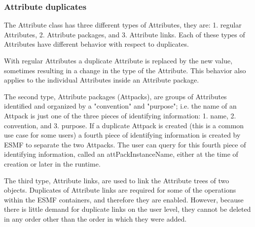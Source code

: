 \subsubsection{Attribute duplicates}

The Attribute class has three different types of Attributes, they are: 1. regular Attributes, 2. Attribute packages, and 3. Attribute links.  Each of these types of Attributes have different behavior with respect to duplicates.

With regular Attributes a duplicate Attribute is replaced by the new value, sometimes resulting in a change in the type of the Attribute.  This behavior also applies to the individual Attributes inside an Attribute package.

The second type, Attribute packages (Attpacks), are groups of Attributes identified and organized by a "convention" and "purpose";  i.e. the name of an Attpack is just one of the three pieces of identifying information: 1. name, 2. convention, and 3. purpose.  If a duplicate Attpack is created (this is a common use case for some users) a fourth piece of identifying information is created by ESMF to separate the two Attpacks. The user can query for this fourth piece of identifying information, called an attPackInstanceName, either at the time of creation or later in the runtime.

The third type, Attribute links, are used to link the Attribute trees of two objects.  Duplicates of Attribute links are required for some of the operations within the ESMF containers, and therefore they are enabled.  However, because there is little demand for duplicate links on the user level, they cannot be deleted in any order other than the order in which they were added.
